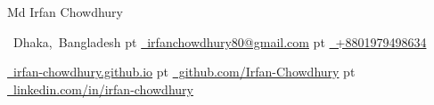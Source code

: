 \documentclass[10pt, letterpaper]{article}
\newenvironment{header}{
    \setlength{\topsep}{0pt}\par\kern\topsep\centering\linespread{1.5}
}{
    \par\kern\topsep
} %
\let\hrefWithoutArrow\href
\begin{document}
    \newcommand{\AND}{\unskip
        \cleaders\copy\ANDbox\hskip\wd\ANDbox
        \ignorespaces
    }
    \newsavebox\ANDbox
    \sbox\ANDbox{$|$}

    \begin{header}
        \fontsize{25 pt}{25 pt}\selectfont Md Irfan Chowdhury

        \vspace{5 pt}


        \normalsize

        \mbox{\faMapMarker\ Dhaka, Bangladesh}%
         pt%
        \mbox{\hrefWithoutArrow{mailto:irfanchowdhury80@gmail.com}
            {\faEnvelope\ irfanchowdhury80@gmail.com}}%
         pt%
        \mbox{\hrefWithoutArrow{tel:+8801979498634}
            {\faPhone\ +8801979498634}}%

        \par\vspace{1 pt}

        \mbox{\hrefWithoutArrow{https://irfan-chowdhury.github.io/}
            {\faGlobe\ irfan-chowdhury.github.io}}%
         pt%
        \mbox{\hrefWithoutArrow{https://github.com/Irfan-Chowdhury}
            {\faGithub\ github.com/Irfan-Chowdhury}}%
         pt%
        \mbox{\hrefWithoutArrow{https://www.linkedin.com/in/irfan-chowdhury}
            {\faLinkedin\ linkedin.com/in/irfan-chowdhury}}%
    \end{header}

    \vspace{5 pt - 0.2 cm}
\end{document}
